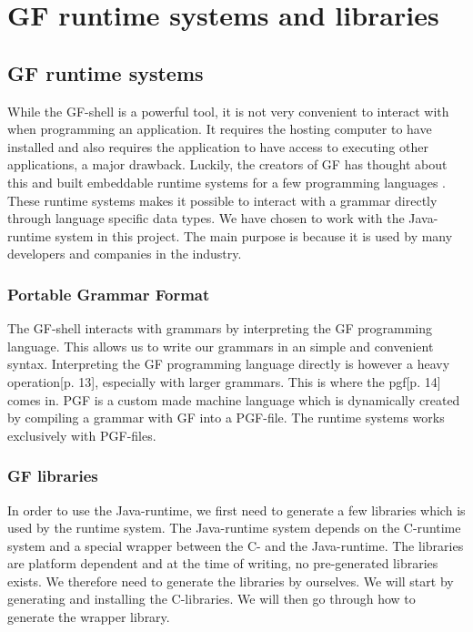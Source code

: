 \chapter{GF runtime systems and libraries}\label{ch:appendix-a}

\section{GF runtime systems}

While the GF-shell is a powerful tool, it is not very convenient to interact with when programming an application. It requires the hosting computer to have installed and also requires the application to have access to executing other applications, a major drawback. Luckily, the creators of GF has thought about this and built embeddable runtime systems for a few programming languages \cite[p. 3]{angelov:2011}. These runtime systems makes it possible to interact with a grammar directly through language specific data types. We have chosen to work with the Java-runtime system in this project. The main purpose is because it is used by many developers and companies in the industry.

\subsection{Portable Grammar Format}
The GF-shell interacts with grammars by interpreting the GF programming language. This allows us to write our grammars in an simple and convenient syntax. Interpreting the GF programming language directly is however a heavy operation\cite{angelov:2011}[p. 13], especially with larger grammars. This is where the \ac{pgf}\cite{angelov:2011}[p. 14] comes in. PGF is a custom made machine language which is dynamically created by compiling a grammar with GF into a PGF-file. The runtime systems works exclusively with PGF-files.

\subsection{GF libraries}
In order to use the Java-runtime, we first need to generate a few libraries which is used by the runtime system. The Java-runtime system depends on the C-runtime system and a special wrapper between the C- and the Java-runtime. The libraries are platform dependent and at the time of writing, no pre-generated libraries exists. We therefore need to generate the libraries by ourselves. We will start by generating and installing the C-libraries. We will then go through how to generate the wrapper library.

